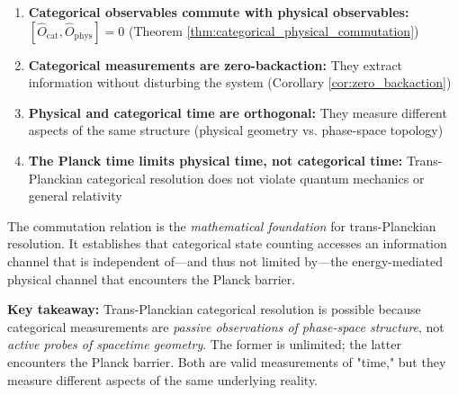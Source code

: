 \documentclass[twocolumn,10pt]{article}
\theoremstyle{remark}
\begin{document}
\begin{enumerate}
    \item \textbf{Categorical observables commute with physical observables:} $[\hat{O}_{\text{cat}}, \hat{O}_{\text{phys}}] = 0$ (Theorem \ref{thm:categorical_physical_commutation})

    \item \textbf{Categorical measurements are zero-backaction:} They extract information without disturbing the system (Corollary \ref{cor:zero_backaction})

    \item \textbf{Physical and categorical time are orthogonal:} They measure different aspects of the same structure (physical geometry vs. phase-space topology)

    \item \textbf{The Planck time limits physical time, not categorical time:} Trans-Planckian categorical resolution does not violate quantum mechanics or general relativity
\end{enumerate}

The commutation relation is the \textit{mathematical foundation} for trans-Planckian resolution. It establishes that categorical state counting accesses an information channel that is independent of—and thus not limited by—the energy-mediated physical channel that encounters the Planck barrier.

\textbf{Key takeaway:} Trans-Planckian categorical resolution is possible because categorical measurements are \textit{passive observations of phase-space structure}, not \textit{active probes of spacetime geometry}. The former is unlimited; the latter encounters the Planck barrier. Both are valid measurements of "time," but they measure different aspects of the same underlying reality.
\end{document}
